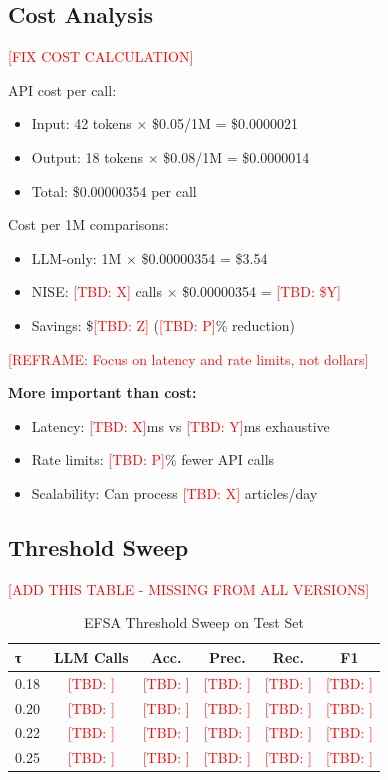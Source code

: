 \documentclass[conference]{IEEEtran}
\newcommand{\tbd}[1]{\textcolor{red}{[TBD: #1]}}
\begin{document}
\subsection{Cost Analysis}

\textcolor{red}{[FIX COST CALCULATION]}

API cost per call:
\begin{itemize}
    \item Input: 42 tokens × \$0.05/1M = \$0.0000021
    \item Output: 18 tokens × \$0.08/1M = \$0.0000014
    \item Total: \$0.00000354 per call
\end{itemize}

Cost per 1M comparisons:
\begin{itemize}
    \item LLM-only: 1M × \$0.00000354 = \$3.54
    \item NISE: \tbd{X} calls × \$0.00000354 = \tbd{\$Y}
    \item Savings: \$\tbd{Z} (\tbd{P}\% reduction)
\end{itemize}

\textcolor{red}{[REFRAME: Focus on latency and rate limits, not dollars]}

\textbf{More important than cost:}
\begin{itemize}
    \item Latency: \tbd{X}ms vs \tbd{Y}ms exhaustive
    \item Rate limits: \tbd{P}\% fewer API calls
    \item Scalability: Can process \tbd{X} articles/day
\end{itemize}

\subsection{Threshold Sweep}

\textcolor{red}{[ADD THIS TABLE - MISSING FROM ALL VERSIONS]}

\begin{table}[h]
\centering
\caption{EFSA Threshold Sweep on Test Set}
\label{tab:sweep}
\begin{tabular}{lccccc}
\toprule
τ & LLM Calls & Acc. & Prec. & Rec. & F1 \\
\midrule
0.18 & \tbd{} & \tbd{} & \tbd{} & \tbd{} & \tbd{} \\
0.20 & \tbd{} & \tbd{} & \tbd{} & \tbd{} & \tbd{} \\
0.22 & \tbd{} & \tbd{} & \tbd{} & \tbd{} & \tbd{} \\
0.25 & \tbd{} & \tbd{} & \tbd{} & \tbd{} & \tbd{} \\
\bottomrule
\end{tabular}
\end{table}
\end{document}
